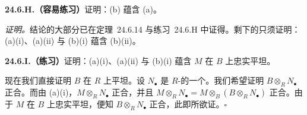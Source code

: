 \textbf{24.6.H.（容易练习）}\quad 证明：(b) 蕴含 (a)。

\emph{证明。}\quad 结论的大部分已在\mbox{定理~24.6.14} 与\mbox{练习~24.6.H} 中证得。剩下的只须证明：(a)(i)、(a)(ii) 与 (b)(i) 蕴含 (b)(ii)。

\textbf{24.6.I.（练习）}\quad 证明：(a)(i)、(a)(ii) 与 (b)(i) 蕴含 $M$ 在 $B$ 上忠实平坦。

现在我们直接证明 $B$ 在 $R$ 上平坦。设 $N_\bullet$ 是 $R$-\trModule{}的一个\trExactSequence。我们希望证明 $B\otimes_R N_\bullet$ 正合。而由 (a)(i)，$M\otimes_R N_\bullet$ 正合，并且 $M\otimes_R N_\bullet=M\otimes_B(B\otimes_R N_\bullet)$ 正合。由于 $M$ 在 $B$ 上忠实平坦，便知 $B\otimes_R N_\bullet$ 正合，此即所欲证。\hfill$\square$


